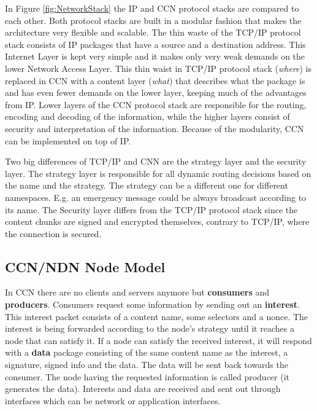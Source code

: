 In Figure \ref{fig:NetworkStack} the IP and CCN protocol stacks are compared to each other. Both protocol stacks are built in a modular fashion that makes the architecture very flexible and scalable. The thin waste of the TCP/IP protocol stack consists of IP packages that have a source and a destination address. This Internet Layer is kept very simple and it makes only very weak demands on the lower Network Access Layer. This thin waist in TCP/IP protocol stack (\emph{where}) is replaced in CCN with a content layer (\emph{what}) that describes what the package is and has even fewer demands on the lower layer, keeping much of the advantages from IP. Lower layers of the CCN protocol stack are responsible for the routing, encoding and decoding of the information, while the higher layers consist of security and interpretation of the information. Because of the modularity, CCN can be implemented on top of IP.

\vspace{5mm} %

Two big differences of TCP/IP and CNN are the strategy layer and the security layer. The strategy layer is responsible for all dynamic routing decisions based on the name and the strategy. The strategy can be a different one for different namespaces. E.g. an emergency message could be always broadcast according to its name. The Security layer differs from the TCP/IP protocol stack since the content chunks are signed and encrypted themselves, contrary to TCP/IP, where the connection is secured.

\subsection{CCN/NDN Node Model}

In CCN there are no clients and servers anymore but \textbf{consumers} and \textbf{producers}. Consumers request some information by sending out an \textbf{interest}. This interest packet consists of a content name, some selectors and a nonce. The interest is being forwarded according to the node's strategy until it reaches a node that can satisfy it. If a node can satisfy the received interest, it will respond with a \textbf{data} package consisting of the same content name as the interest, a signature, signed info and the data. The data will be sent back towards the consumer. The node having the requested information is called producer (it generates the data). Interests and data are received and sent out through interfaces which can be network or application interfaces.

